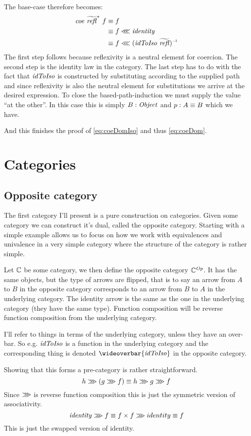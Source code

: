 The base-case therefore becomes:
\begin{align*}
\var{coe}\ {\widetilde{\refl}}^*\ f
& \equiv f \\
& \equiv f \lll \var{identity} \\
& \equiv f \lll \inv{(\var{idToIso}\ \widetilde{\refl})}
\end{align*}
%
The first step follows because reflexivity is a neutral element for coercion.
The second step is the identity law in the category. The last step has to do
with the fact that $\mathit{idToIso}$ is constructed by substituting according to
the supplied path and since reflexivity is also the neutral element for
substitutions we arrive at the desired expression. To close the
based-path-induction we must supply the value ``at the other''. In this case
this is simply $B \mathrel{:} \mathit{Object}$ and $p \mathrel{:} A \equiv B$ which we have.

And this finishes the proof of \ref{eq:coeDomIso} and thus \ref{eq:coeDom}.
%
\section{Categories}
\subsection{Opposite category}
\label{op-cat}
The first category I'll present is a pure construction on categories. Given some
category we can construct it's dual, called the opposite category. Starting with
a simple example allows us to focus on how we work with equivalences and
univalence in a very simple category where the structure of the category is
rather simple.

Let $\mathbb{C}$ be some category, we then define the opposite category
$\mathbb{C}^{\mathit{Op}}$. It has the same objects, but the type of arrows are flipped,
that is to say an arrow from $A$ to $B$ in the opposite category corresponds to
an arrow from $B$ to $A$ in the underlying category. The identity arrow is the
same as the one in the underlying category (they have the same type). Function
composition will be reverse function composition from the underlying category.

I'll refer to things in terms of the underlying category, unless they have an
over-bar. So e.g. $\mathit{idToIso}$ is a function in the underlying category and the
corresponding thing is denoted $\wideoverbar{\idToIso}$ in the opposite
category.

Showing that this forms a pre-category is rather straightforward. 
%
$$
h \ggg (g \ggg f) \equiv h \ggg g \ggg f
$$
%
Since $\ggg$ is reverse function composition this is just the symmetric version
of associativity.
%
$$
\mathit{identity} \ggg f \equiv f \times f \ggg identity \equiv f
$$
%
This is just the swapped version of identity.

